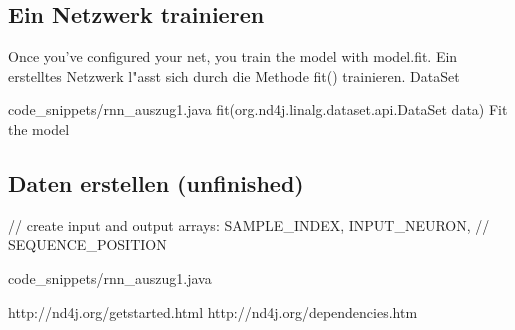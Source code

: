 {\subsection{Ein Netzwerk trainieren}
Once you’ve configured your net, you train the model with model.fit.
Ein erstelltes Netzwerk l"asst sich durch die Methode fit() trainieren. DataSet

{code_snippets/rnn_auszug1.java}
fit(org.nd4j.linalg.dataset.api.DataSet data)
Fit the model

\subsection{Daten erstellen (unfinished)}
// create input and output arrays: SAMPLE\_INDEX, INPUT\_NEURON,
    // SEQUENCE\_POSITION

{code_snippets/rnn_auszug1.java}


http://nd4j.org/getstarted.html
http://nd4j.org/dependencies.htm

} %